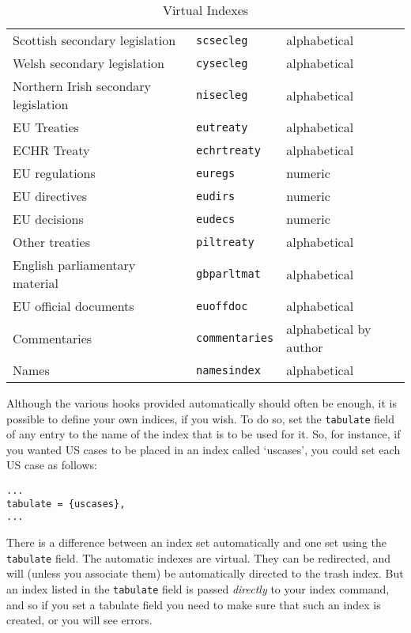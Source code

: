 \documentclass[a5paper,fontsize=9pt,DIV=1]{scrartcl}
\newcounter{egcounter}\setcounter{egcounter}{0}
\newenvironment{bibexample}[1][]{%
  \medskip\par\small\noindent\ignorespaces
  \marginpar{[\refstepcounter{egcounter}\arabic{egcounter}]\label{#1}}
  \begin{minipage}[t]{0.95\linewidth}}
 {\end{minipage}\par\medskip}
\begin{document}
\begin{table}
\begin{tabular}{lll}
Scottish secondary legislation       & \texttt{scsecleg}     & alphabetical \\
Welsh secondary legislation          & \texttt{cysecleg}     & alphabetical \\
Northern Irish secondary legislation & \texttt{nisecleg}     & alphabetical \\
EU Treaties                          & \texttt{eutreaty}     & alphabetical \\
ECHR Treaty                          & \texttt{echrtreaty}   & alphabetical \\
EU regulations                       & \texttt{euregs}       & numeric \\
EU directives                        & \texttt{eudirs}       & numeric \\
EU decisions                         & \texttt{eudecs}       & numeric \\
Other treaties                       & \texttt{piltreaty}    & alphabetical \\
English parliamentary material       & \texttt{gbparltmat}   & alphabetical \\
EU official documents                & \texttt{euoffdoc}     & alphabetical \\
Commentaries                         & \texttt{commentaries} & alphabetical 
                                                               by author \\
Names                                & \texttt{namesindex}   & alphabetical\\
\bottomrule
\end{tabular}
\caption{Virtual Indexes\label{categories}}
\end{table}

Although\label{tabulate} the various hooks provided automatically
should often be enough, it is possible to define your own indices, if you
wish. To do so, set the \texttt{tabulate} field of any entry to the
name of the index that is to be used for it. So, for instance, if you
wanted US cases to be placed in an index called `uscases', you could
set each US case as follows:
\begin{bibexample}[tabulation]
\begin{verbatim}
...
tabulate = {uscases},
...
\end{verbatim}
\end{bibexample}
There is a difference between an index set automatically and one set
using the \verb|tabulate| field. The automatic indexes are
virtual. They can be redirected, and will (unless you associate them)
be automatically directed to the trash index. But an index listed in
the \verb|tabulate| field is passed \emph{directly} to your index
command, and so if you set a tabulate field you need to make sure that
such an index is created, or you will see
errors.
\end{document}
